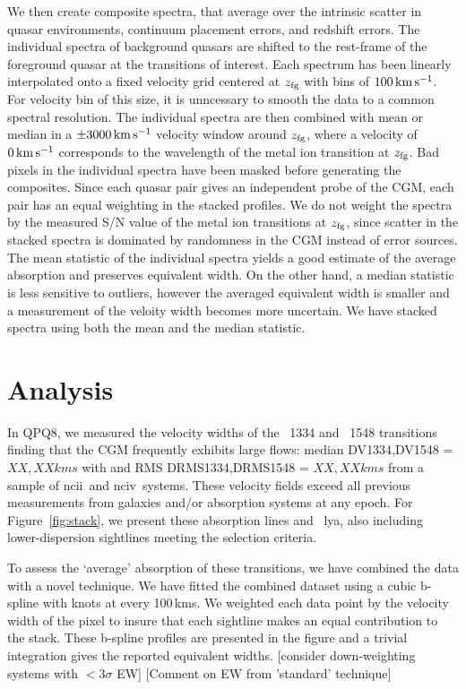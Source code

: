 \documentclass[iop]{emulateapj}
\begin{document}
We then create composite spectra, that average over the intrinsic scatter in quasar environments, 
continuum placement errors, and redshift errors. The individual spectra 
of background quasars are shifted to the rest-frame of the foreground quasar at the transitions of 
interest. Each spectrum has been linearly 
interpolated onto a fixed velocity grid centered at $z_{\rm fg}$ with bins of 
$100\,{\rm km\,s^{-1}}$. For velocity bin of this size, it is unncessary to smooth the data to a 
common spectral resolution. The individual spectra are then combined with mean 
or median in a $\pm3000\,{\rm km\,s^{-1}}$ velocity window around $z_{\rm fg}$, where a velocity 
of $0\,{\rm km\,s^{-1}}$ corresponds to the wavelength of the metal ion transition at 
$z_{\rm fg}$. Bad pixels in the individual spectra have been masked before generating the 
composites. Since each quasar pair gives an independent probe of the CGM, each pair has an equal 
weighting in the stacked profiles. We do not weight the spectra by the measured S/N value of the 
metal ion transitions at $z_{\rm fg}$, since scatter in the stacked spectra is dominated by 
randomness in the CGM instead of error sources. The mean statistic of the individual spectra 
yields a good estimate of the average absorption and preserves equivalent width. On the other 
hand, a median statistic is less sensitive to outliers, however the averaged equivalent width is 
smaller and a measurement of the veloity width becomes more uncertain. We have stacked spectra 
using both the mean and the median statistic. 

\section{Analysis}
\label{sec:analysis}

In QPQ8, we measured the velocity widths of the ~1334
and ~1548 transitions finding that the CGM
frequently exhibits large flows:
median DV{1334},DV{1548} = $XX,XX kms$ with and
RMS DRMS{1334},DRMS{1548} = $XX, XX kms$ from
a sample of ncii\ and nciv\ systems.
These velocity fields exceed all previous measurements from
galaxies and/or absorption systems at any epoch.  For
Figure~\ref{fig:stack}, we present these absorption lines
and ~lya, also including lower-dispersion 
sightlines meeting the selection criteria.

To assess the `average' absorption of these transitions,
we have combined the data with a novel technique.
We have fitted the combined dataset using a cubic b-spline
with knots at every 100\,kms.  We weighted each data
point by the velocity width of the pixel to insure that 
each sightline makes an equal contribution to the stack.
These b-spline profiles are presented in the figure
and a trivial integration gives the reported equivalent
widths.
[consider down-weighting systems with $<3\sigma$ EW]
[Comnent on EW from 'standard' technique]
\end{document}
